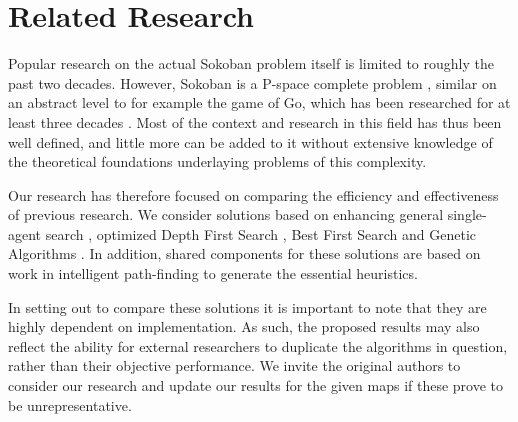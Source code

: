\section{Related Research}
Popular research on the actual Sokoban problem itself is limited to roughly the past two decades. However, Sokoban is a P-space complete problem \cite{culberson1999sokoban}, similar on an abstract level to for example the game of Go, which has been researched for at least three decades \cite{lichtenstein1980go}. Most of the context and research in this field has thus been well defined, and little more can be added to it without extensive knowledge of the theoretical foundations underlaying problems of this complexity.

Our research has therefore focused on comparing the efficiency and effectiveness of previous research. We consider solutions based on enhancing general single-agent search \cite{junghanns2001sokoban}, optimized Depth First Search \cite{nishihara2004depth}, Best First Search \cite{korf1993linear} and Genetic Algorithms \cite{goldberg1989genetic}. In addition, shared components for these solutions are based on work in intelligent path-finding \cite{stout1996smart} to generate the essential heuristics.

In setting out to compare these solutions it is important to note that they are highly dependent on implementation. As such, the proposed results may also reflect the ability for external researchers to duplicate the algorithms in question, rather than their objective performance. We invite the original authors to consider our research and update our results for the given maps if these prove to be unrepresentative.